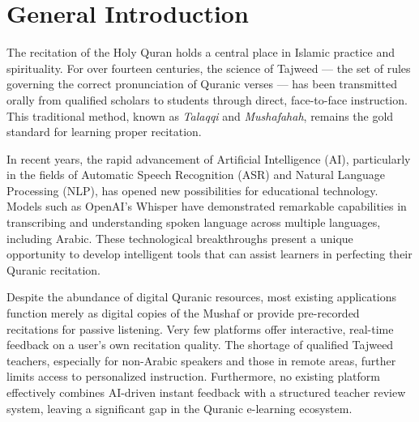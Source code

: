 \chapter*{General Introduction}
\label{ch:general_intro}

The recitation of the Holy Quran holds a central place in Islamic practice and spirituality. For over fourteen centuries, the science of Tajweed --- the set of rules governing the correct pronunciation of Quranic verses --- has been transmitted orally from qualified scholars to students through direct, face-to-face instruction. This traditional method, known as \textit{Talaqqi} and \textit{Mushafahah}, remains the gold standard for learning proper recitation.

In recent years, the rapid advancement of Artificial Intelligence (AI), particularly in the fields of Automatic Speech Recognition (ASR) and Natural Language Processing (NLP), has opened new possibilities for educational technology. Models such as OpenAI's Whisper have demonstrated remarkable capabilities in transcribing and understanding spoken language across multiple languages, including Arabic. These technological breakthroughs present a unique opportunity to develop intelligent tools that can assist learners in perfecting their Quranic recitation.

\begin{warnbox}[title=Problem Statement]
Despite the abundance of digital Quranic resources, most existing applications function merely as digital copies of the Mushaf or provide pre-recorded recitations for passive listening. Very few platforms offer interactive, real-time feedback on a user's own recitation quality. The shortage of qualified Tajweed teachers, especially for non-Arabic speakers and those in remote areas, further limits access to personalized instruction. Furthermore, no existing platform effectively combines AI-driven instant feedback with a structured teacher review system, leaving a significant gap in the Quranic e-learning ecosystem.
\end{warnbox}

